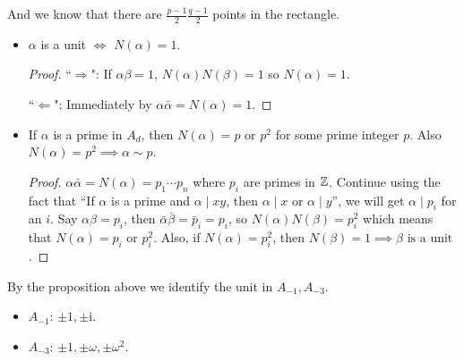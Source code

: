 \begin{prop}
\begin{itemize}
\begin{figure}[H]
      \end{figure}
      And we know that there are $\frac{p-1}{2} \frac{q-1}{2}$ points in the rectangle.
  \end{itemize}
\end{prop}

\begin{prop}
  \begin{itemize}
    \item $\alpha$ is a unit $\iff$ $N(\alpha) = 1$.
      \begin{proof}
        ``$\Rightarrow$": If $\alpha \beta = 1$, $N(\alpha) N(\beta) = 1$ so $N(\alpha) = 1$.

        ``$\Leftarrow$": Immediately by $\alpha \bar{\alpha} = N(\alpha) = 1$.
      \end{proof}
    \item If $\alpha$ is a prime in $A_d$, then $N(\alpha) = p \text{ or } p^2$
      for some prime integer $p$. Also $N(\alpha) = p^2 \implies \alpha \sim p$.
      \begin{proof}
        $\alpha \bar{\alpha} = N(\alpha) = p_1 \dotsm p_n$ where $p_i$ are
        primes in $\mathbb{Z}$. Continue using the fact that ``If $\alpha$
        is a prime and $\alpha \mid xy$, then $\alpha \mid x$ or $\alpha \mid y$'',
        we will get $\alpha \mid p_i$ for an $i$. Say $\alpha \beta = p_i$,
        then $\bar{\alpha}\bar{\beta} = \bar{p}_i = p_i$,
        so $N(\alpha) N(\beta) = p_i^2$ which means that $N(\alpha) = p_i \text{ or } p_i^2$.
        Also, if $N(\alpha) = p_i^2$, then $N(\beta) = 1 \implies \beta \text{ is a unit }$.
      \end{proof}
  \end{itemize}
\end{prop}

By the proposition above we identify the unit in $A_{-1}, A_{-3}$.
\begin{itemize}
  \item $A_{-1}$: $\pm 1, \pm \mathrm{i}$.
  \item $A_{-3}$: $\pm 1, \pm \omega, \pm \omega^2$.
\end{itemize}

